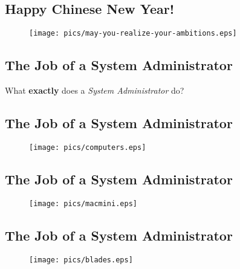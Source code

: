 \documentclass[xga]{xdvislides}
\begin{document}
\subsection{Happy Chinese New Year!}
\vspace*{\fill}
\begin{figure}[hb]
	\begin{center}
		\texttt{[image: pics/may-you-realize-your-ambitions.eps]} \\
	\end{center}
\end{figure}
\vspace*{\fill}




\subsection{The Job of a System Administrator}
What {\bf exactly} does a {\em System Administrator} do?

\subsection{The Job of a System Administrator}
\begin{figure}[hb]
	\begin{center}
		\texttt{[image: pics/computers.eps]} \\
	\end{center}
\end{figure}

\subsection{The Job of a System Administrator}
\vspace*{\fill}
\begin{figure}[hb]
	\begin{center}
		\texttt{[image: pics/macmini.eps]} \\
	\end{center}
\end{figure}
\vspace*{\fill}

\subsection{The Job of a System Administrator}
\vspace*{\fill}
\begin{figure}[hb]
	\begin{center}
		\texttt{[image: pics/blades.eps]} \\
	\end{center}
\end{figure}
\vspace*{\fill}
\end{document}
